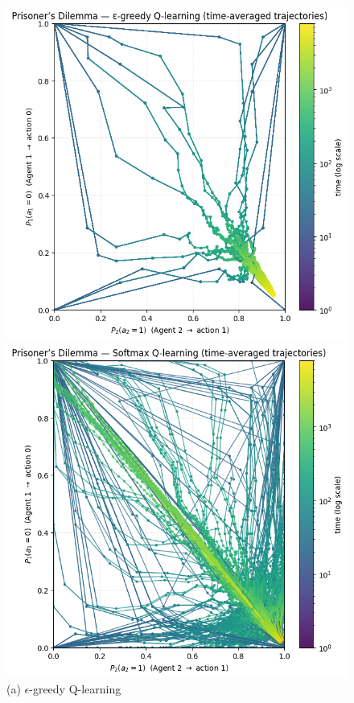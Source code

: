 \begin{figure}[h]
    \centering
    \begin{minipage}{0.32\textwidth}
        \centering
        \includegraphics[width=\linewidth]{figures/task-2/learning/pd_egreedy.png}
        \caption*{(a) $\epsilon$-greedy Q-learning}
    \end{minipage}
    \hfill
    \begin{minipage}{0.32\textwidth}
        \centering
        \includegraphics[width=\linewidth]{figures/task-2/learning/pd_boltz.png}

\end{minipage}
\end{figure}
